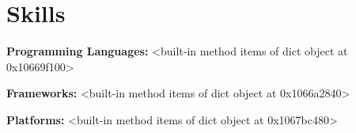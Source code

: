 \section{Skills}

    \begin{onecolentry}
        \textbf{Programming Languages:} <built-in method items of dict object at 0x10669f100>
    \end{onecolentry}

    \vspace{0.05 cm}

    \begin{onecolentry}
        \textbf{Frameworks:} <built-in method items of dict object at 0x1066a2840>
    \end{onecolentry}

    \vspace{0.05 cm}

    \begin{onecolentry}
        \textbf{Platforms:} <built-in method items of dict object at 0x1067bc480>
    \end{onecolentry}

    \vspace{0.05 cm}

